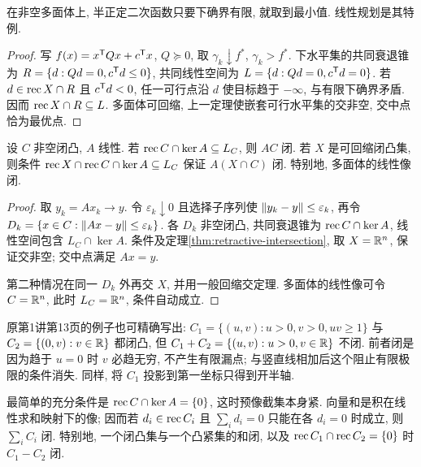 \begin{corollary}\label{cor:qp-attainment}
在非空多面体上, 半正定二次函数只要下确界有限, 就取到最小值. 线性规划是其特例.
\end{corollary}
\begin{proof}
写 $f(x)=x^{\mathsf T} Qx+c^{\mathsf T} x$, $Q\succeq0$, 取 $\gamma_k\downarrow f^*$, $\gamma_k>f^*$. 下水平集的共同衰退锥为 $R=\{d:Qd=0,c^{\mathsf T} d\le0\}$, 共同线性空间为 $L=\{d:Qd=0,c^{\mathsf T} d=0\}$. 若 $d\in\operatorname{rec} X\cap R$ 且 $c^{\mathsf T} d<0$, 任一可行点沿 $d$ 使目标趋于 $-\infty$, 与有限下确界矛盾. 因而 $\operatorname{rec} X\cap R\subseteq L$. 多面体可回缩, 上一定理使嵌套可行水平集的交非空, 交中点恰为最优点.
\end{proof}

\begin{theorem}\label{thm:closed-image}
设 $C$ 非空闭凸, $A$ 线性. 若 $\operatorname{rec} C\cap\ker A\subseteq L_C$, 则 $AC$ 闭. 若 $X$ 是可回缩闭凸集, 则条件 $\operatorname{rec} X\cap\operatorname{rec} C\cap\ker A\subseteq L_C$ 保证 $A(X\cap C)$ 闭. 特别地, 多面体的线性像闭.
\end{theorem}
\begin{proof}
取 $y_k=Ax_k\to y$. 令 $\varepsilon_k\downarrow0$ 且选择子序列使 $\lVert y_k-y\rVert\le\varepsilon_k$, 再令 $D_k=\{x\in C:\lVert Ax-y\rVert\le\varepsilon_k\}$. 各 $D_k$ 非空闭凸, 共同衰退锥为 $\operatorname{rec} C\cap\ker A$, 线性空间包含 $L_C\cap\ker A$. 条件及定理\ref{thm:retractive-intersection}, 取 $X=\mathbb R^n$, 保证交非空; 交中点满足 $Ax=y$.

第二种情况在同一 $D_k$ 外再交 $X$, 并用一般回缩交定理. 多面体的线性像可令 $C=\mathbb R^n$, 此时 $L_C=\mathbb R^n$, 条件自动成立.
\end{proof}
原第1讲第13页的例子也可精确写出: $C_1=\{(u,v):u>0,v>0,uv\ge1\}$ 与 $C_2=\{(0,v):v\in\mathbb R\}$ 都闭凸, 但 $C_1+C_2=\{(u,v):u>0,v\in\mathbb R\}$ 不闭. 前者闭是因为趋于 $u=0$ 时 $v$ 必趋无穷, 不产生有限漏点; 与竖直线相加后这个阻止有限极限的条件消失. 同样, 将 $C_1$ 投影到第一坐标只得到开半轴.

最简单的充分条件是 $\operatorname{rec} C\cap\ker A=\{0\}$, 这时预像截集本身紧. 向量和是积在线性求和映射下的像; 因而若 $d_i\in\operatorname{rec} C_i$ 且 $\sum_i d_i=0$ 只能在各 $d_i=0$ 时成立, 则 $\sum_iC_i$ 闭. 特别地, 一个闭凸集与一个凸紧集的和闭, 以及 $\operatorname{rec} C_1\cap\operatorname{rec} C_2=\{0\}$ 时 $C_1-C_2$ 闭.

